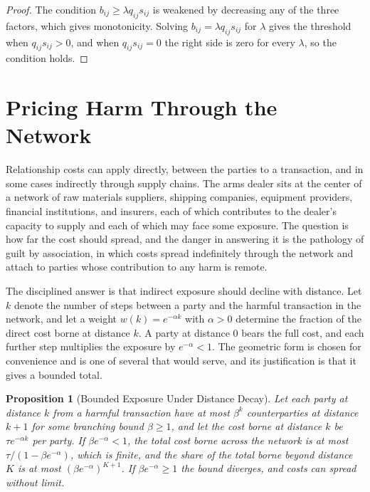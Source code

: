 \documentclass[11pt]{report}
\newtheorem{proposition}[theorem]{Proposition}
\theoremstyle{definition}
\theoremstyle{remark}
\begin{document}
\begin{proof}
The condition $b_{ij}\ge\lambda q_{ij}s_{ij}$ is weakened by decreasing any of the three factors, which gives monotonicity. Solving $b_{ij}=\lambda q_{ij}s_{ij}$ for $\lambda$ gives the threshold when $q_{ij}s_{ij}>0$, and when $q_{ij}s_{ij}=0$ the right side is zero for every $\lambda$, so the condition holds.
\end{proof}

\section{Pricing Harm Through the Network}

Relationship costs can apply directly, between the parties to a transaction, and in some cases indirectly through supply chains. The arms dealer sits at the center of a network of raw materials suppliers, shipping companies, equipment providers, financial institutions, and insurers, each of which contributes to the dealer's capacity to supply and each of which may face some exposure. The question is how far the cost should spread, and the danger in answering it is the pathology of guilt by association, in which costs spread indefinitely through the network and attach to parties whose contribution to any harm is remote.

The disciplined answer is that indirect exposure should decline with distance. Let $k$ denote the number of steps between a party and the harmful transaction in the network, and let a weight $w(k)=e^{-\alpha k}$ with $\alpha>0$ determine the fraction of the direct cost borne at distance $k$. A party at distance $0$ bears the full cost, and each further step multiplies the exposure by $e^{-\alpha}<1$. The geometric form is chosen for convenience and is one of several that would serve, and its justification is that it gives a bounded total.

\begin{proposition}[Bounded Exposure Under Distance Decay]\label{prop:decay}
Let each party at distance $k$ from a harmful transaction have at most $\beta^k$ counterparties at distance $k+1$ for some branching bound $\beta\ge1$, and let the cost borne at distance $k$ be $\tau e^{-\alpha k}$ per party. If $\beta e^{-\alpha}<1$, the total cost borne across the network is at most $\tau/(1-\beta e^{-\alpha})$, which is finite, and the share of the total borne beyond distance $K$ is at most $(\beta e^{-\alpha})^{K+1}$. If $\beta e^{-\alpha}\ge1$ the bound diverges, and costs can spread without limit.
\end{proposition}
\end{document}
